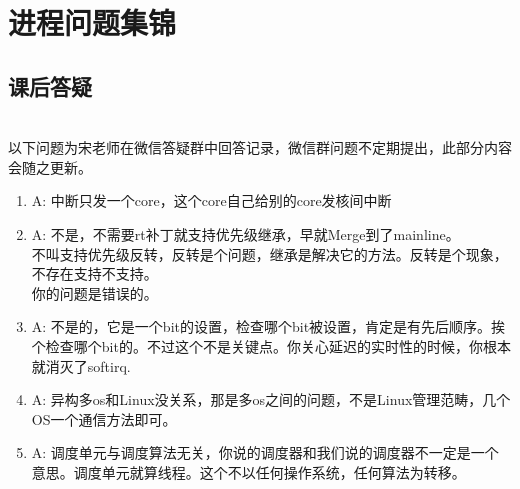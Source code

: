 \partabstractfp{}
\partabstractrp{}

\part{进程问题集锦}

\chapter{课后答疑}


~\\以下问题为宋老师在微信答疑群中回答记录，微信群问题不定期提出，此部分内容会随之更新。
\begin{enumerate}
  \item
\begin{tcolorbox}[colback=green!5,colframe=green!75!black]
\tcblower
A: 中断只发一个core，这个core自己给别的core发核间中断
\end{tcolorbox}

  \item
\begin{tcolorbox}[colback=green!5,colframe=green!75!black]
\tcblower
A: 不是，不需要rt补丁就支持优先级继承，早就Merge到了mainline。\\
不叫支持优先级反转，反转是个问题，继承是解决它的方法。反转是个现象，不存在支持不支持。\\
你的问题是错误的。
\end{tcolorbox}


  \item
\begin{tcolorbox}[colback=green!5,colframe=green!75!black]
\tcblower
A: 不是的，它是一个bit的设置，检查哪个bit被设置，肯定是有先后顺序。挨个检查哪个bit的。不过这个不是关键点。你关心延迟的实时性的时候，你根本就消灭了softirq.
\end{tcolorbox}

  \item
\begin{tcolorbox}[colback=green!5,colframe=green!75!black]
\tcblower
A: 异构多os和Linux没关系，那是多os之间的问题，不是Linux管理范畴，几个OS一个通信方法即可。
\end{tcolorbox}

  \item
\begin{tcolorbox}[colback=green!5,colframe=green!75!black]
\tcblower
A: 调度单元与调度算法无关，你说的调度器和我们说的调度器不一定是一个意思。调度单元就算线程。这个不以任何操作系统，任何算法为转移。
\end{tcolorbox}



\end{enumerate}
